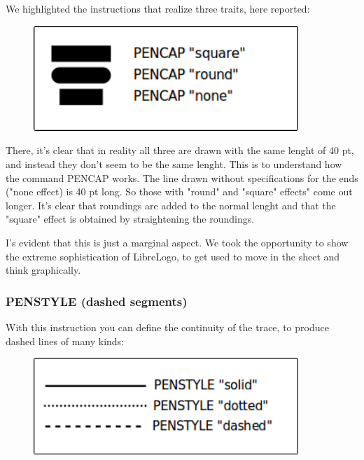 We highlighted the instructions that realize three traits, here reported:

\vskip 1cm

\begin{figure}[H]
   \centering
   \includegraphics[width=10.0cm,trim=8 8 8 8,clip]{./images/disegnare/disegnare-36.png}
   \label{dis-38}
\end{figure}

\vskip 1cm

There, it's clear that in reality all three are drawn with the same lenght of 40 pt, and instead they don't seem to be the same lenght.
This is to understand how the command PENCAP works. The line drawn without specifications for the ends ("none effect) is 40 pt long.
So those with "round" and "square" effects" come out longer. It's clear that roundings are added to the normal lenght and that the "square" effect is obtained by straightening the roundings.

I's evident that this is just a marginal aspect. We took the opportunity to show the extreme sophistication of LibreLogo, to get used to move in the sheet and think graphically.

\subsubsection{PENSTYLE (dashed segments)}

With this instruction you can define the continuity of the trace, to produce dashed lines of many kinds:

\vskip 1cm

\begin{figure}[H]
   \centering
   \includegraphics[width=10.0cm,trim=8 8 8 8,clip]{./images/disegnare/disegnare-38.png}
   \label{dis-39}
\end{figure}

